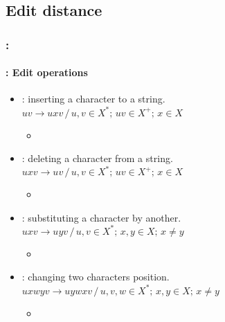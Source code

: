 \documentclass[xcolor=table]{beamer}
\begin{document}
\subsection{Edit distance}

\begin{frame}
	\frametitle{\insertshortsubtitle: \insertsection}
	\framesubtitle{\insertsubsection: Edit operations}

	\begin{itemize}
		\item {}: inserting a character to a string.\\
		$uv \rightarrow uxv \,/\, u, v \in X^*;\, uv \in X^+;\, x \in X$
		\begin{itemize}
			\item {}
		\end{itemize}
		
		\item {}: deleting a character from a string.\\
		$uxv \rightarrow uv \,/\, u, v \in X^*;\, uv \in X^+;\, x \in X$
		\begin{itemize}
			\item {}
		\end{itemize}
		
		\item {}: substituting a character by another.\\
		$uxv \rightarrow uyv \,/\, u, v \in X^*;\, x, y \in X;\, x \ne y$
		\begin{itemize}
			\item {}
		\end{itemize}
		
		\item {}: changing two characters position.\\
		$uxwyv \rightarrow uywxv \,/\, u, v, w \in X^*;\, x, y \in X;\, x \ne y$
		\begin{itemize}
			\item {}
		\end{itemize}
	\end{itemize}

\end{frame}
\end{document}
